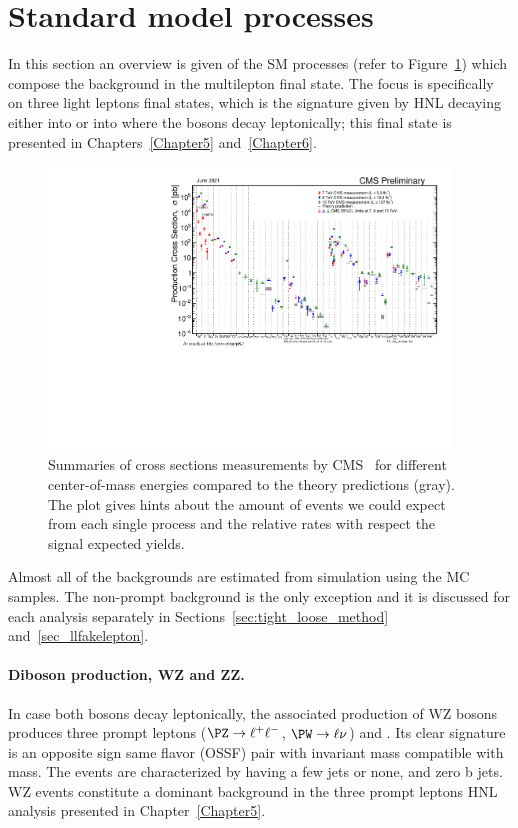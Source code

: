 \section{Standard model processes}\label{sec:c4sm}
In this section an overview is given of the SM processes (refer to Figure~\ref{fig:crosssection}) which
compose the background in the multilepton final state. The focus is
specifically on three light leptons final states, which is the
signature given by HNL decaying either into \PZ or into \PW where the bosons
decay leptonically; this final state is presented in
Chapters~\ref{Chapter5} and~\ref{Chapter6}.
\begin{figure}[h]
\centering
  \includegraphics[width=0.95\textwidth]{Figures/c4/SigmaNew_v0.pdf}
  \caption{Summaries of cross sections measurements by CMS~\cite{cmspublic} for
    different center-of-mass energies compared to the theory
    predictions (gray). The plot gives hints about the
    amount of events we could expect from each single process and the
    relative rates with respect the signal expected yields.}
  \label{fig:crosssection}
\end{figure}

Almost all of the backgrounds are estimated from simulation using the
MC samples. The non-prompt background is the only exception and it is
discussed for each analysis separately in Sections~\ref{sec:tight_loose_method}
and~\ref{sec_llfakelepton}. 

\paragraph{Diboson production, WZ and ZZ.}\label{sec:c4wz_zz}
In case both bosons decay leptonically, the associated production of
WZ bosons produces three prompt leptons ($\PZ \rightarrow \ell^{+}
\ell^{-}$, $\PW \rightarrow \ell \nu$) and \ptmiss.
Its clear signature is an opposite sign same flavor (OSSF) pair with
invariant mass compatible with \PZ mass. The events are characterized by
having a few jets or none, and zero b jets.
WZ events
constitute a dominant background in the three prompt leptons HNL
analysis presented in Chapter~\ref{Chapter5}.

